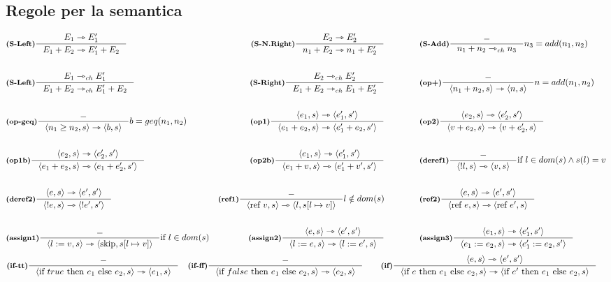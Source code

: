 \documentclass[a4paper, 10pt]{article}
\theoremstyle{definition}
\newcommand{\infer}[4]{\inference[\textbf{#1}]{#2}{#3}#4 }
\newcommand{\srule}[2]{\langle #1 \rangle \rightarrowtriangle \langle #2 \rangle}
\newcommand{\memrep}[3]{#1 \lbrack #2 \mapsto #3 \rbrack}
\newcommand{\goesto}{\rightarrowtriangle}
\begin{document}
\subsection*{Regole per la semantica}
	\begin{align*}
		&\infer{(S-Left)}{E_1 \goesto E_1' }{E_1 + E_2 \goesto E_1' + E_2}{} 
		&\infer{(S-N.Right)}{E_2 \goesto E_2'}{n_1 + E_2 \goesto n_1 + E_2'}{} \qquad\qquad
		&\infer{(S-Add)}{-}{n_1+n_2 \goesto_{ch} n_3}{n_3 = add(n_1, n_2)} \\ \\
		&\infer{(S-Left)}{E_1 \goesto_{ch} E_1'}{E_1 + E_2 \goesto_{ch} E_1' + E_2}{} 
		&\infer{(S-Right)}{E_2 \goesto_{ch} E_2'}{E_1 + E_2 \goesto_{ch} E_1 + E_2'}{} \qquad\qquad
		&\infer{(op+)}{-}{\srule{n_1 + n_2,s}{n,s}}{n=add(n_1,n_2)} \\ \\
		&\infer{(op-geq)}{-}{\srule{n_1 \geq n_2,s}{b,s}}{b=geq(n_1, n_2)} 
		&\infer{(op1)}{\srule{e_1,s}{e_1', s'}}{\srule{e_1 + e_2,s}{e_1' + e_2,s'}}{} \qquad\qquad
		&\infer{(op2)}{\srule{e_2,s}{e_2', s'}}{\srule{v + e_2,s}{v + e_2',s}}{} \\ \\
		&\infer{(op1b)}{\srule{e_2,s}{e_2', s'}}{\srule{e_1 + e_2,s}{e_1 + e_2',s'}}{} 
		&\infer{(op2b)}{\srule{e_1,s}{e_1', s'}}{\srule{e_1 + v,s}{e_1' + v',s'}}{} \qquad\qquad
		&\infer{(deref1)}{-}{\srule{!l,s}{v,s}}{\text{if } l \in dom(s) \wedge s(l)=v} \\ \\
		&\infer{(deref2)}{\srule{e,s}{e',s'}}{\srule{!e,s}{!e',s'}}{} 
		&\infer{(ref1)}{-}{\srule{\text{ref }v, s}{l, \memrep{s}{l}{v}}}{l \notin dom(s)} \qquad\qquad
		&\infer{(ref2)}{\srule{e,s}{e',s'}}{\srule{\text{ref }e,s}{\text{ref } e',s}}{}\\ \\
		&\infer{(assign1)}{-}{\srule{l:=v,s}{\text{skip}, \memrep{s}{l}{v}}}{\text{if } l \in dom(s)} 
		&\infer{(assign2)}{\srule{e,s}{e',s'}}{\srule{l:=e,s}{l:=e',s}}{} \qquad\qquad
		&\infer{(assign3)}{\srule{e_1,s}{e_1',s'}}{\srule{e_1:=e_2,s}{e_1':=e_2,s'}}{}
	\end{align*}
	\begin{align*}
		&\infer{(if-tt)}{-}{\srule{\text{if } true \text{ then } e_1 \text{ else } e_2,s}{e_1,s}}{}
		&\infer{(if-ff)}{-}{\srule{\text{if } false \text{ then } e_1 \text{ else } e_2,s}{e_2,s}}{}\qquad
		&\infer{(if)}{\srule{e,s}{e',s'}}{\srule{\text{if } e \text{ then } e_1 \text{ else } e_2,s}{\text{if } e' \text{ then } e_1 \text{ else } e_2,s}}{}
	\end{align*}
\end{document}
